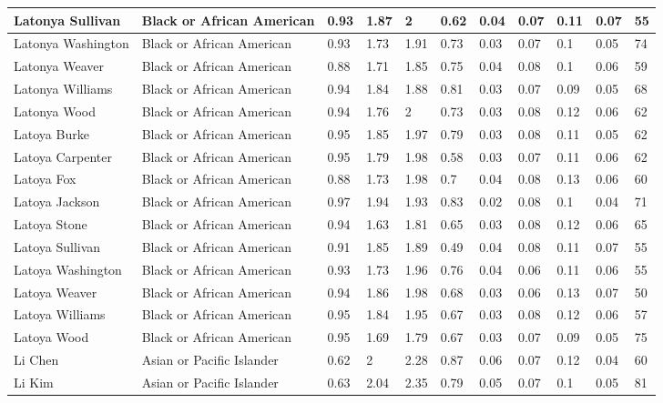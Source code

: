 \begin{table}[!ht]
\begin{tabular}{|l|l|l|l|l|l|l|l|l|l|l|}
        Latonya Sullivan & Black or African American & 0.93 & 1.87 & 2 & 0.62 & 0.04 & 0.07 & 0.11 & 0.07 & 55 \\ \hline
        Latonya Washington & Black or African American & 0.93 & 1.73 & 1.91 & 0.73 & 0.03 & 0.07 & 0.1 & 0.05 & 74 \\ \hline
        Latonya Weaver & Black or African American & 0.88 & 1.71 & 1.85 & 0.75 & 0.04 & 0.08 & 0.1 & 0.06 & 59 \\ \hline
        Latonya Williams & Black or African American & 0.94 & 1.84 & 1.88 & 0.81 & 0.03 & 0.07 & 0.09 & 0.05 & 68 \\ \hline
        Latonya Wood & Black or African American & 0.94 & 1.76 & 2 & 0.73 & 0.03 & 0.08 & 0.12 & 0.06 & 62 \\ \hline
        Latoya Burke & Black or African American & 0.95 & 1.85 & 1.97 & 0.79 & 0.03 & 0.08 & 0.11 & 0.05 & 62 \\ \hline
        Latoya Carpenter & Black or African American & 0.95 & 1.79 & 1.98 & 0.58 & 0.03 & 0.07 & 0.11 & 0.06 & 62 \\ \hline
        Latoya Fox & Black or African American & 0.88 & 1.73 & 1.98 & 0.7 & 0.04 & 0.08 & 0.13 & 0.06 & 60 \\ \hline
        Latoya Jackson & Black or African American & 0.97 & 1.94 & 1.93 & 0.83 & 0.02 & 0.08 & 0.1 & 0.04 & 71 \\ \hline
        Latoya Stone & Black or African American & 0.94 & 1.63 & 1.81 & 0.65 & 0.03 & 0.08 & 0.12 & 0.06 & 65 \\ \hline
        Latoya Sullivan & Black or African American & 0.91 & 1.85 & 1.89 & 0.49 & 0.04 & 0.08 & 0.11 & 0.07 & 55 \\ \hline
        Latoya Washington & Black or African American & 0.93 & 1.73 & 1.96 & 0.76 & 0.04 & 0.06 & 0.11 & 0.06 & 55 \\ \hline
        Latoya Weaver & Black or African American & 0.94 & 1.86 & 1.98 & 0.68 & 0.03 & 0.06 & 0.13 & 0.07 & 50 \\ \hline
        Latoya Williams & Black or African American & 0.95 & 1.84 & 1.95 & 0.67 & 0.03 & 0.08 & 0.12 & 0.06 & 57 \\ \hline
        Latoya Wood & Black or African American & 0.95 & 1.69 & 1.79 & 0.67 & 0.03 & 0.07 & 0.09 & 0.05 & 75 \\ \hline
        Li Chen & Asian or Pacific Islander & 0.62 & 2 & 2.28 & 0.87 & 0.06 & 0.07 & 0.12 & 0.04 & 60 \\ \hline
        Li Kim & Asian or Pacific Islander & 0.63 & 2.04 & 2.35 & 0.79 & 0.05 & 0.07 & 0.1 & 0.05 & 81 \\ \hline

\end{tabular}
\end{table}
